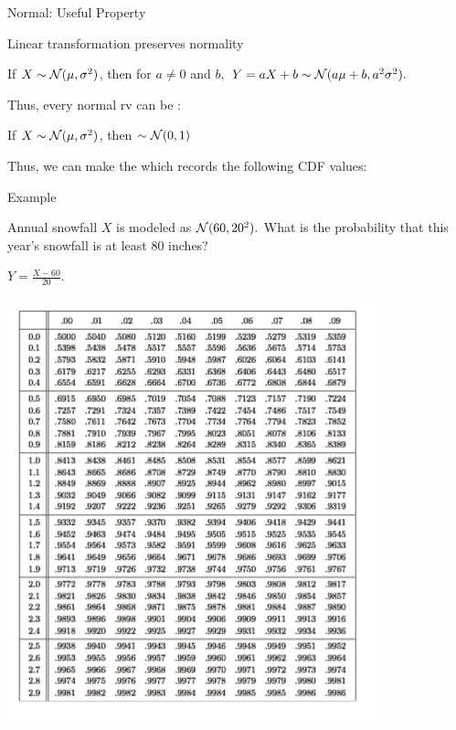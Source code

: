 \begin{frame}{Normal: Useful Property}

\plitemsep 0.1in
\bci
\item<2-> Linear transformation preserves normality

\mycolorbox
{
If $X \sim  \mathcal N(\mu, \sigma^2) $, then for $a \neq 0$ and $b,$ $Y = aX +b \sim \mathcal N(a\mu +b,a^2 \sigma^2).$
}

\item<3-> Thus, every normal rv can be :

If $X \sim  \mathcal N(\mu, \sigma^2)$, then
 $\sim \mathcal N(0,1)$

\item<5-> Thus, we can make the  which records the following CDF values:

\eci
\end{frame}

\begin{frame}{Example}

\medskip

{
\plitemsep 0.1in
\bci
\item<1-> Annual snowfall $X$ is modeled as $\mathcal N(60,20^2).$ What is the probability that this year's snowfall is at least 80 inches?

\item<2-> $Y = \frac{X-60}{20}.$
\eci
}
{
\includegraphics[width=0.8\textwidth]{L4_normal_table.png}
}
\end{frame}


